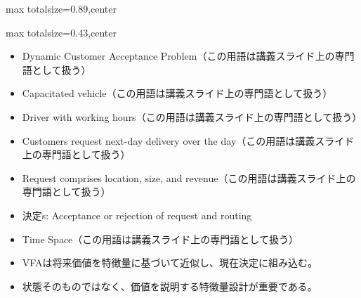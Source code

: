 \begin{minipage}[t]{0.58\textwidth}
\begin{adjustbox}{max totalsize={\textwidth}{0.89\textheight},center}
\begin{minipage}{\textwidth}
\end{minipage}
\end{adjustbox}
\end{minipage}


\clearpage
{}
\begin{minipage}[t]{0.405\textwidth}
\begin{adjustbox}{max totalsize={\textwidth}{0.43\textheight},center}
\begin{minipage}{\textwidth}\scriptsize
{}\begin{itemize}
\item Dynamic Customer Acceptance Problem（この用語は講義スライド上の専門語として扱う）
\item Capacitated vehicle（この用語は講義スライド上の専門語として扱う）
\item Driver with working hours（この用語は講義スライド上の専門語として扱う）
\item Customers request next-day delivery over the day（この用語は講義スライド上の専門語として扱う）
\item Request comprises location, size, and revenue（この用語は講義スライド上の専門語として扱う）
\item 決定s: Acceptance or rejection of request and routing
\item Time Space（この用語は講義スライド上の専門語として扱う）
\end{itemize}\begin{itemize}
\item VFAは将来価値を特徴量に基づいて近似し、現在決定に組み込む。
\item 状態そのものではなく、価値を説明する特徴量設計が重要である。
\end{itemize}
\end{minipage}
\end{adjustbox}
\end{minipage}\hfill
